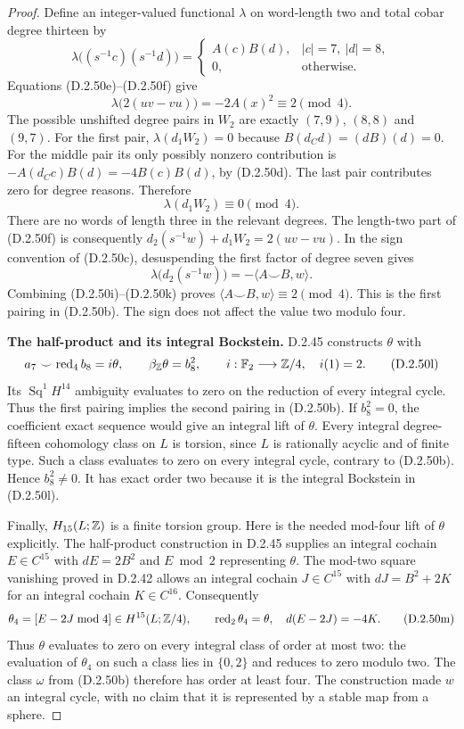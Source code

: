 \begin{proof}
Define an integer-valued functional $\lambda$ on word-length
two and total cobar degree thirteen by
\[
 \lambda\big((s^{-1}c)(s^{-1}d)\big)=
 \begin{cases}
 A(c)B(d),& |c|=7,\ |d|=8,\\
 0,&\text{otherwise}.
 \end{cases}
 \tag{D.2.50h}
\]
Equations \textup{(D.2.50e)--(D.2.50f)} give
\[
                \lambda\big(2(uv-vu)\big)
                  =-2A(x)^2\equiv2\pmod4.
                  \tag{D.2.50i}
\]
The possible unshifted degree pairs in $W_2$ are exactly
$(7,9)$, $(8,8)$ and $(9,7)$. For the first pair,
$\lambda(d_1W_2)=0$ because $B(d_Cd)=(dB)(d)=0$.
For the middle pair its only possibly nonzero contribution
is $-A(d_Cc)B(d)=-4B(c)B(d)$, by \textup{(D.2.50d)}.
The last pair contributes zero for degree reasons. Therefore
\[
                            \lambda(d_1W_2)\equiv0\pmod4.
                            \tag{D.2.50j}
\]
There are no words of length three in the relevant degrees.
The length-two part of \textup{(D.2.50f)} is consequently
$d_2(s^{-1}w)+d_1W_2=2(uv-vu)$.
In the sign convention of \textup{(D.2.50c)}, desuspending
the first factor of degree seven gives
\[
 \lambda\big(d_2(s^{-1}w)\big)
             =-\langle A\smile B,w\rangle.
 \tag{D.2.50k}
\]
Combining \textup{(D.2.50i)--(D.2.50k)} proves
$\langle A\smile B,w\rangle\equiv2\pmod4$.
This is the first pairing in \textup{(D.2.50b)}. The sign
does not affect the value two modulo four.

\textbf{The half-product and its integral Bockstein.}
D.2.45 constructs $\theta$ with
\[
 a_7\smile\operatorname{red}_4b_8=i\theta,
 \qquad \beta_{\mathbb Z}\theta=b_8^2,
 \qquad i:\mathbb F_2\longrightarrow\mathbb Z/4,\quad i(1)=2.
 \tag{D.2.50l}
\]
Its $\operatorname{Sq}^1H^{14}$ ambiguity evaluates to zero
on the reduction of every integral cycle. Thus the first
pairing implies the second pairing in \textup{(D.2.50b)}.
If $b_8^2=0$, the coefficient exact sequence would give an
integral lift of $\theta$. Every integral degree-fifteen
cohomology class on $L$ is torsion, since $L$ is rationally
acyclic and of finite type. Such a class evaluates to zero
on every integral cycle, contrary to
\textup{(D.2.50b)}. Hence $b_8^2\ne0$.
It has exact order two because it is the integral
Bockstein in \textup{(D.2.50l)}.

Finally, $H_{15}(L;\mathbb Z)$ is a finite torsion group.
Here is the needed mod-four lift of $\theta$ explicitly.
The half-product construction in D.2.45 supplies an integral
cochain $E\in C^{15}$ with $dE=2B^2$ and $E\bmod2$
representing $\theta$. The mod-two square vanishing proved
in D.2.42 allows an integral cochain $J\in C^{15}$ with
$dJ=B^2+2K$ for an integral cochain $K\in C^{16}$.
Consequently
\[
 \theta_4=[E-2J\bmod4]\in H^{15}(L;\mathbb Z/4),
 \qquad\operatorname{red}_2\theta_4=\theta,
 \quad d(E-2J)=-4K.
 \tag{D.2.50m}
\]
Thus $\theta$ evaluates to zero on every integral class
of order at most two: the evaluation of $\theta_4$ on such
a class lies in $\{0,2\}$ and reduces to zero modulo two.
The class $\omega$ from \textup{(D.2.50b)} therefore has
order at least four. The construction made $w$ an integral
cycle, with no claim that it is represented by a stable map
from a sphere.
\end{proof}
